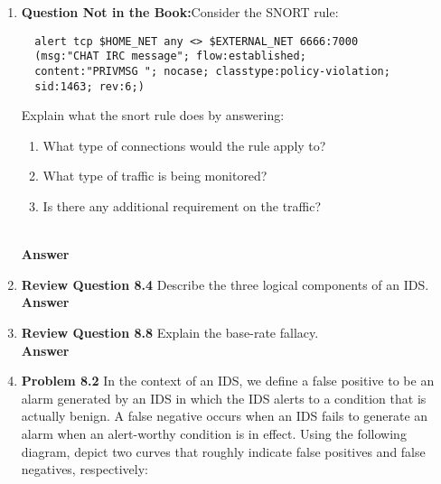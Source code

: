 \documentclass[12pt]{article}
\begin{document}
\renewcommand{\headrulewidth}{0.4pt}
\vspace{-3mm}
\begin{enumerate}
  \item \textbf{Question Not in the Book:}Consider the SNORT rule:
  \vspace{-1em}

  {\color{blue}
  \begin{verbatim}
  alert tcp $HOME_NET any <> $EXTERNAL_NET 6666:7000
  (msg:"CHAT IRC message"; flow:established;
  content:"PRIVMSG "; nocase; classtype:policy-violation;
  sid:1463; rev:6;)
  \end{verbatim}
  }
   Explain what the  snort rule does by answering:
   \begin{enumerate}
     \item What type of connections would the rule apply to?
     \item What type of traffic is being monitored?
     \item Is there any additional requirement on the traffic?
   \end{enumerate} \\

  \textbf{Answer} \\

  \item \textbf{Review Question 8.4} Describe the three logical components of an IDS.\\

  \textbf{Answer} \\

  \item \textbf{Review Question 8.8} Explain the base-rate fallacy.\\

  \textbf{Answer} \\

  \item \textbf{Problem 8.2} In the context of an IDS, we define a false positive to be an alarm generated by an IDS in which the IDS alerts to a condition that is actually benign. A false negative occurs when an IDS fails to generate an alarm when an alert-worthy condition is in effect. Using the following diagram, depict two curves that roughly indicate false positives and false negatives, respectively:\\


\end{enumerate}
\end{document}
